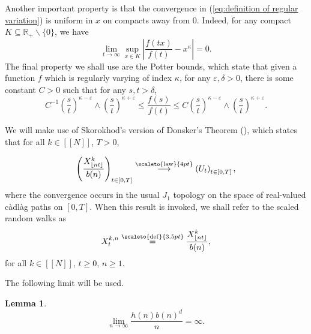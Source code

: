 \documentclass[12pt]{article}
\newcommand{\RR}{\mathbb R}
\newcommand{\1}{\mathds{1}}
\newcommand{\distribution}{\stackrel{\scaleto{\mathrm{law}}{4pt}}{\longrightarrow}}
\newcommand{\eqdef}{\stackrel{\scaleto{\mathrm{def}}{3.5pt}}{=}}
\newtheorem{lemma}{Lemma}
\numberwithin{equation}{section}
\begin{document}
Another important property is that the convergence in (\ref{eq:definition of regular variation}) is uniform in $x$ on compacts away from $0$. Indeed, for any compact $K\subseteq\RR_+\backslash\{0\}$, we have 
\begin{equation}
\label{limit:uniform convergence on compacts for regularly varying functions}
    \lim_{t\rightarrow\infty}\sup_{x\in K}\left|\frac{f(tx)}{f(t)}-x^\kappa\right|=0.
\end{equation}
The final property we shall use are the Potter bounds, which state that given a function $f$ which is regularly varying of index $\kappa$, for any $\varepsilon,\delta>0$, there is some constant $C>0$ such that for any $s,t>\delta$,
\begin{equation}
    \label{ineq:Potter bounds}
    C^{-1}\left(\frac{s}{t}\right)^{\kappa-\varepsilon}\wedge\left(\frac{s}{t}\right)^{\kappa+\varepsilon}\le\frac{f(s)}{f(t)}\le C\left(\frac{s}{t}\right)^{\kappa-\varepsilon}\wedge\left(\frac{s}{t}\right)^{\kappa+\varepsilon}.
\end{equation}

We will make use of Skorokhod's version of Donsker's Theorem (\cite{SkorokhodLimitTheoremsStochProc1956}), which states that for all $k\in[\![N]\!]$, $T>0$,

\begin{equation}
    \label{convergence:skorokhod's convergence theorem}
    \left(\frac{X_{\lfloor nt\rfloor}^k}{b(n)}\right)_{t\in[0,T]}\distribution\left(U_t\right)_{t\in[0,T]},
\end{equation}
where the convergence occurs in the usual $J_1$ topology on the space of real-valued càdlàg paths on $[0,T]$. When this result is invoked, we shall refer to the scaled random walks as
\begin{equation*}
    X_t^{k,n}\eqdef\frac{X_{\lfloor nt\rfloor}^k}{b(n)},
\end{equation*}
for all $k\in[\![N]\!]$, $t\ge0$, $n\ge1$.

The following limit will be used.
\begin{lemma}
\label{lemma:limit of h(n)b(n)^d/n}
    \begin{equation*}
        \underset{n\rightarrow\infty}\lim\frac{h(n)b(n)^d}{n}=\infty.
    \end{equation*}
\end{lemma}
\end{document}
